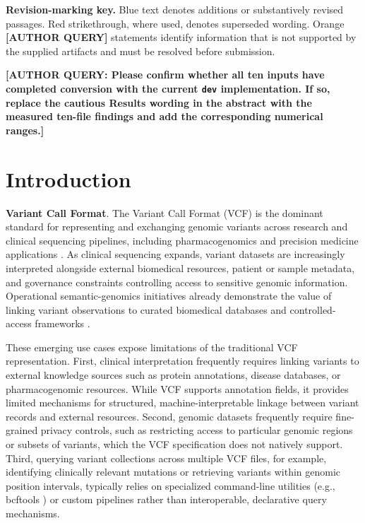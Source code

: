 \documentclass[pdflatex,sn-mathphys-num]{sn-jnl}%
\newenvironment{revision}{\begingroup\color{revisionblue}}{\endgroup}%
\newcommand{\authorquery}[1]{%
  \par\smallskip\noindent
  {\color{queryorange}\textbf{[AUTHOR QUERY: #1]}}%
  \par\smallskip
}%
\theoremstyle{thmstyleone}%
\theoremstyle{thmstyletwo}%
\theoremstyle{thmstylethree}%
\begin{document}
\maketitle

\begin{revision}
\noindent\textbf{Revision-marking key.} Blue text denotes additions or substantively revised passages. Red strikethrough, where used, denotes superseded wording. Orange \textbf{[AUTHOR QUERY]} statements identify information that is not supported by the supplied artifacts and must be resolved before submission.
\end{revision}
\authorquery{Please confirm whether all ten inputs have completed conversion with the current \texttt{dev} implementation. If so, replace the cautious Results wording in the abstract with the measured ten-file findings and add the corresponding numerical ranges.}

\section{Introduction}\label{sec1}

\textbf{Variant Call Format}.
The Variant Call Format (VCF) is the dominant standard for representing and exchanging genomic variants across research and clinical sequencing pipelines, including pharmacogenomics and precision medicine applications \cite{vcf_spec_2024,pharmcat,souche_recommendations_2022}. 
As clinical sequencing expands, variant datasets are increasingly interpreted alongside external biomedical resources, patient or sample metadata, and governance constraints controlling access to sensitive genomic information. 
Operational semantic-genomics initiatives already demonstrate the value of linking variant observations to curated biomedical databases and controlled-access frameworks \cite{togovar_2022,sphn_semantic_2023}.

These emerging use cases expose limitations of the traditional VCF representation.
First, clinical interpretation frequently requires linking variants to external knowledge sources such as protein annotations, disease databases, or pharmacogenomic resources. 
While VCF supports annotation fields, it provides limited mechanisms for structured, machine-interpretable linkage between variant records and external resources. 
Second, genomic datasets frequently require fine-grained privacy controls, such as restricting access to particular genomic regions or subsets of variants, which the VCF specification does not natively support.
Third, querying variant collections across multiple VCF files, for example, identifying clinically relevant mutations or retrieving variants within genomic position intervals, typically relies on specialized command-line utilities (e.g., bcftools \cite{BCFtools}) or custom pipelines rather than interoperable, declarative query mechanisms.
\end{document}

